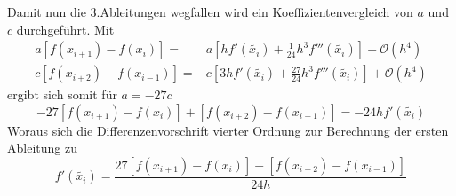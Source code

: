 \documentclass[Protokollheft.tex]{subfiles}
\begin{document}
	Damit nun die 3.Ableitungen wegfallen wird ein Koeffizientenvergleich von $a$ und $c$ durchgeführt.
	Mit 
	\begin{align*}
		a[f(x_{i+1})-f(x_i)] =& a[hf'(\tilde{x_i}) + \frac{1}{24}h^3 f'''(\tilde{x_i})]+\mathcal{O}(h^4) \\
		c[f(x_{i+2})-f(x_{i-1})] =& c[3hf'(\tilde{x_i}) + \frac{27}{24}h^3f'''(\tilde{x_i}) ]+ \mathcal{O}(h^4)
	\end{align*}
	ergibt sich somit für $a = -27c$ 
	\begin{equation*}
		-27[f(x_{i+1})-f(x_i)]+[f(x_{i+2})-f(x_{i-1})] = -24 hf'(\tilde{x_i})
	\end{equation*}
	Woraus sich die Differenzenvorschrift vierter Ordnung zur Berechnung der ersten Ableitung zu 
	\begin{equation}
	\label{eq:DifVorOrd4}
	f'(\tilde{x_i}) = \frac{27[f(x_{i+1})-f(x_i)]-[f(x_{i+2})-f(x_{i-1})]}{24h}
	\end{equation}
	
\end{document}
